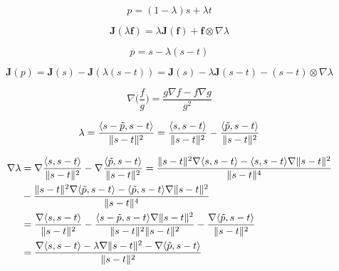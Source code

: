 \documentclass[11pt]{article} %
\DeclarePairedDelimiter{\norm}{\lVert}{\rVert}
\begin{document}
%
\begin{equation}
p = (1 - \lambda) s + \lambda t
\end{equation}

\begin{equation}
\textbf{J}(\lambda \textbf{f}) = \lambda \textbf{J}(\textbf{f}) + \textbf{f} \otimes \nabla\lambda
\end{equation}

\begin{equation}
p = s - \lambda (s - t)
\end{equation}

\begin{equation}
\textbf{J}(p) = \textbf{J}(s) - \textbf{J}(\lambda (s - t)) = \textbf{J}(s) - \lambda \textbf{J}(s - t) - (s - t) \otimes\nabla\lambda 
\end{equation}

\begin{equation}
\nabla\Big(\frac{f}{g}\Big) = \frac{g \nabla f - f \nabla g}{g^{2}}
\end{equation}

\begin{equation}
\lambda = \frac{\langle s - \tilde{p}, s - t \rangle}{\norm{s - t}^{2}} = \frac{\langle s, s - t \rangle}{\norm{s - t}^{2}} - \frac{\langle \tilde{p}, s - t \rangle}{\norm{s - t}^{2}}
\end{equation}

\begin{align}
\nabla\lambda &= \nabla\frac{\langle s, s - t \rangle}{\norm{s - t}^{2}} - \nabla\frac{\langle \tilde{p}, s - t \rangle}{\norm{s - t}^{2}} = \frac{\norm{s - t}^{2} \nabla\langle s, s - t \rangle - \langle s, s - t \rangle \nabla\norm{s - t}^{2}}{\norm{s - t}^{4}} \\
&- \frac{\norm{s - t}^{2} \nabla\langle \tilde{p}, s - t \rangle - \langle\tilde{p}, s - t \rangle \nabla\norm{s - t}^{2}}{\norm{s - t}^{4}} \\
&=  \frac{\nabla\langle s, s - t \rangle}{\norm{s - t}^{2}} - \frac{\langle s - \tilde{p}, s - t \rangle \nabla\norm{s - t}^{2}}
{\norm{s - t}^{2} \norm{s - t}^{2}} - \frac{\nabla\langle \tilde{p}, s - t \rangle}{\norm{s - t}^{2}}\\
&=  \frac{\nabla\langle s, s - t \rangle - \lambda\nabla\norm{s - t}^{2} - \nabla\langle \tilde{p}, s - t \rangle}{\norm{s - t}^{2}}
\end{align}
\end{document}
